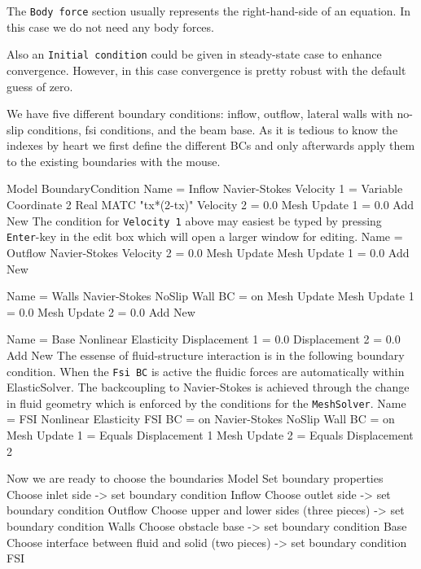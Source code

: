 The \texttt{Body force} section usually represents the right-hand-side of an equation. 
In this case we do not need any body forces.

Also an \texttt{Initial condition} could be given in steady-state case to enhance convergence. However, 
in this case convergence is pretty robust with the default guess of zero.

We have five different boundary conditions: inflow, outflow, lateral walls with no-slip conditions, 
fsi conditions, and the beam base. 
As it is tedious to know the indexes by heart we 
first define the different BCs and only afterwards apply them to the existing boundaries 
with the mouse. 

\ttbegin
Model
  BoundaryCondition
    Name = Inflow
    Navier-Stokes 
      Velocity 1 = Variable Coordinate 2 
        Real MATC "tx*(2-tx)"
      Velocity 2 = 0.0
      Mesh Update 1 = 0.0
    Add
    New
\ttend
The condition for \texttt{Velocity 1} above may easiest be typed by pressing \texttt{Enter}-key in the
edit box which will open a larger window for editing.
\ttbegin
    Name = Outflow
    Navier-Stokes 
      Velocity 2 = 0.0
    Mesh Update
      Mesh Update 1 = 0.0
    Add
    New

    Name = Walls
    Navier-Stokes 
      NoSlip Wall BC = on
    Mesh Update
      Mesh Update 1 = 0.0
      Mesh Update 2 = 0.0
    Add 
    New
 
    Name = Base
    Nonlinear Elasticity
      Displacement 1 = 0.0
      Displacement 2 = 0.0
    Add
    New
\ttend
The essense of fluid-structure interaction is in the following boundary condition. 
When the \texttt{Fsi BC} is active the fluidic forces are automatically within ElasticSolver.
The backcoupling to Navier-Stokes is achieved through the change in fluid geometry which is enforced
by the conditions for the \texttt{MeshSolver}.
\ttbegin
    Name = FSI 
    Nonlinear Elasticity 
      FSI BC = on
    Navier-Stokes 
      NoSlip Wall BC = on
    Mesh Update 1 = Equals Displacement 1
    Mesh Update 2 = Equals Displacement 2
\ttend   

Now we are ready to choose the boundaries 
\ttbegin
Model
  Set boundary properties
    Choose inlet side -> set boundary condition Inflow
    Choose outlet side -> set boundary condition Outflow
    Choose upper and lower sides (three pieces) -> set boundary condition Walls
    Choose obstacle base -> set boundary condition Base
    Choose interface between fluid and solid (two pieces) -> set boundary condition FSI
\ttend

